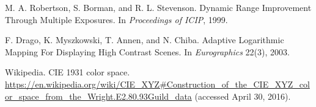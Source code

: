 \begin{thebibliography}{DMAC03}

    M. A. Robertson, S. Borman, and R. L. Stevenson.
    Dynamic Range Improvement Through Multiple Exposures.
    In \emph{Proceedings of ICIP}, 1999.

    F. Drago, K. Myszkowski, T. Annen, and N. Chiba.
    Adaptive Logarithmic Mapping For Displaying High Contrast Scenes.
    In \emph{Eurographics} 22(3), 2003.

    Wikipedia. CIE 1931 color space.
    \url{https://en.wikipedia.org/wiki/CIE\_XYZ\#Construction\_of\_the\_CIE\_XYZ\_color\_space\_from\_the\_Wright.E2.80.93Guild\_data}
    (accessed April 30, 2016).

\end{thebibliography}
